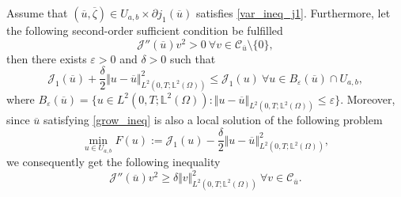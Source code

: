 \documentclass[reqno]{amsart}
\begin{document}
	\begin{theorem}
		Assume that $(\overline{u}, \overline{\zeta}) \in U_{a, b} \times \partial j_1(\overline{u})$ satisfies \eqref{var_ineq_j1}. Furthermore, let the following second-order sufficient condition be fulfilled
		\begin{equation} \label{ssc}
			\mathcal{J}''(\overline{u})v^2 >0 \ \forall v \in \mathcal{C}_{\overline{u}} \setminus \{0 \},
		\end{equation}
		then there exists $\varepsilon>0$ and $\delta >0$ such that
		\begin{equation} \label{grow_ineq}
			\mathcal{J}_1 (\overline{u})+ \frac{\delta}{2} \Vert u - \overline{u} \Vert^2_{L^2(0,T;\mathbb{L}^2(\Omega))} \leq \mathcal{J}_1 (u) \ \forall u \in B_\varepsilon(\overline{u}) \cap U_{a,b},
		\end{equation}
		where $\displaystyle B_\varepsilon(\overline{u}) = \{ u\in L^2(0,T;\mathbb{L}^2(\Omega)) : \Vert u - \overline{u} \Vert_{L^2(0,T;\mathbb{L}^2(\Omega))} \leq \varepsilon \}.$
		Moreover, since $\overline{u}$ satisfying \eqref{grow_ineq} is also a local solution of the following problem
		\begin{equation*}
			\underset{u \in U_{a, b}}{\min} F(u) := \mathcal{J}_1(u) - \frac{\delta}{2} \Vert u - \overline{u} \Vert^2_{L^2(0,T;\mathbb{L}^2(\Omega))},
		\end{equation*}
		we consequently get the following inequality
		\begin{equation*}
			\mathcal{J}''(\overline{u})v^2 \geq \delta\Vert v \Vert^2_{L^2(0,T;\mathbb{L}^2(\Omega))} \ \forall v\in \mathcal{C}_{\overline{u}}.
		\end{equation*}
	\end{theorem}
\end{document}

